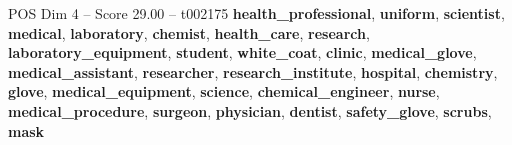 \begin{textsample}{POS Dim 4 – Score 29.00 – t002175}  \label{ex:f4_pos_017}
\textbf{health\_professional}, \textbf{uniform}, \textbf{scientist}, \textbf{medical}, \textbf{laboratory}, \textbf{chemist}, \textbf{health\_care}, \textbf{research}, \textbf{laboratory\_equipment}, \textbf{student}, \textbf{white\_coat}, \textbf{clinic}, \textbf{medical\_glove}, \textbf{medical\_assistant}, \textbf{researcher}, \textbf{research\_institute}, \textbf{hospital}, \textbf{chemistry}, \textbf{glove}, \textbf{medical\_equipment}, \textbf{science}, \textbf{chemical\_engineer}, \textbf{nurse}, \textbf{medical\_procedure}, \textbf{surgeon}, \textbf{physician}, \textbf{dentist}, \textbf{safety\_glove}, \textbf{scrubs}, \textbf{mask}

\end{textsample}
